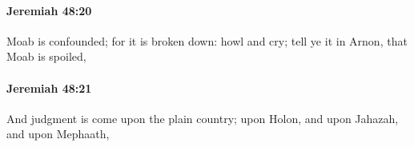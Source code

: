 		\paragraph{Jeremiah 48:20} %
			\label{JEREMIAH-48-20}

			Moab is confounded; for it is broken down: howl and cry; tell ye it in Arnon, that Moab is spoiled,


		\paragraph{Jeremiah 48:21} %
			\label{JEREMIAH-48-21}

			And judgment is come upon the plain country; upon Holon, and upon Jahazah, and upon Mephaath,


